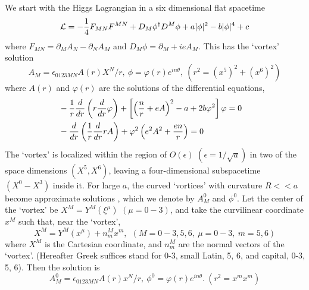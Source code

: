 \documentclass[a4paper,12pt]{article}
\begin{document}
We start with the Higgs Lagrangian in a six dimensional flat spacetime
\begin{equation}
{\cal L}=-{1\over4}F_{MN}F^{MN}+D_M\phi^\dagger D^M\phi +a|\phi |^2-b|\phi |^4 +c
  \label{1}  \end{equation}
where 
$F_{MN}=\partial_MA_N-\partial_NA_M$ and $D_M \phi =\partial_M +ieA_M$.
This has the `vortex' solution \cite{2} 
\begin{equation}
A_M=\epsilon_{0123MN}A(r)X^N/r,\ \phi=\varphi(r)e^{in\theta},\ (r^2=(x^5)^2+(x^6)^2)
  \label{2}  \end{equation}
where $A(r)$ and $\varphi(r)$ are the solutions of the differential equations,
\begin{eqnarray}\displaystyle
&-\frac{1}{r}\frac{d}{dr}\left(r{d \over dr}\varphi\right)
+\left[\left({n \over r}+eA\right)^2-a+2b\varphi^2\right]\varphi=0\cr
&-{d \over dr}\left({1\over r}{d \over dr}rA\right)
+\varphi^2\left(e^2A^2+{en \over r}\right)=0
  \label{3}  \end{eqnarray}
The `vortex' is localized within the region of $O(\epsilon)$ $(\epsilon=1/\sqrt{a})$
in two of the space dimensions $(X^5,X^6)$, leaving a four-dimensional subspacetime
$(X^0-X^3)$ inside it. 
For large $a$, the curved `vortices' with curvature $R<<a$ become approximate solutions \cite{3},
which we denote by $A_M^0$ and $\phi^0$.
Let the center of the `vortex' be $X^M=Y^M(\xi^\mu)$ $(\mu=0-3)$, and 
take the curvilinear coordinate $x^M$ such that, near the `vortex',
\begin{equation}
X^M=Y^M(x^\mu)+n_m^M x^m,\ \ (M=0-3,5,6,\ \mu=0-3,\ m=5,6)
  \label{4}  \end{equation}
where $X^M$ is the Cartesian coordinate, and $n_m^M$ are the normal vectors of the `vortex'.
(Hereafter Greek suffices stand for 0-3, small Latin, 5, 6, and capital, 0-3, 5, 6).
Then the solution is 
\begin{equation}
A_M^0=\epsilon_{0123MN}A(r)x^N/r,\ \phi^0=\varphi(r)e^{in\theta}.\ (r^2=x^m x^m)
  \label{5}  \end{equation}
\end{document}

